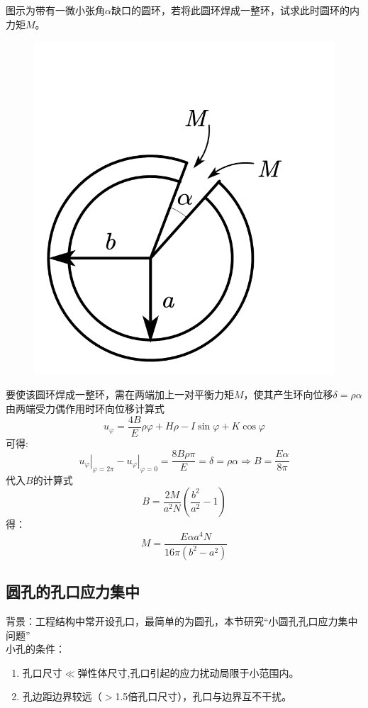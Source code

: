 \begin{example}
图示为带有一微小张角$\alpha$缺口的圆环，若将此圆环焊成一整环，试求此时圆环的内力矩$M$。
\begin{figure}[!h]
\centering
\includegraphics[scale=0.6]{figure/4-11.png}
\end{figure}
\end{example}
\begin{remark}
要使该圆环焊成一整环，需在两端加上一对平衡力矩$M$，使其产生环向位移$\delta =\rho \alpha $由两端受力偶作用时环向位移计算式\[u_{\varphi}=\frac{4B}{E}\rho \varphi +H\rho -I\sin \varphi +K\cos \varphi \]
可得:\[\left. u_{\varphi} \right|_{\varphi =2\pi}-\left. u_{\varphi} \right|_{\varphi =0}=\frac{8B\rho \pi}{E}=\delta =\rho \alpha \Rightarrow B=\frac{E\alpha}{8\pi}\]
代入$B$的计算式\[B=\frac{2M}{a^2N}\left( \frac{b^2}{a^2}-1 \right) \]
得：\[M=\frac{E\alpha a^4N}{16\pi \left( b^2-a^2 \right)}\]
\end{remark}

\subsection{圆孔的孔口应力集中}
背景：工程结构中常开设孔口，最简单的为圆孔，本节研究“小圆孔孔口应力集中问题”\\
小孔的条件：
\begin{enumerate}
\item 孔口尺寸$\ll $弹性体尺寸,孔口引起的应力扰动局限于小范围内。
\item 孔边距边界较远（$>$1.5倍孔口尺寸），孔口与边界互不干扰。
\end{enumerate}